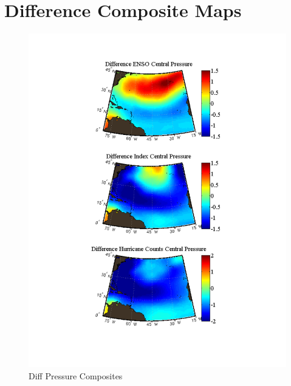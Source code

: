 \documentclass[a4paper,10pt]{article}
\begin{document}
\section{Difference Composite Maps}
\begin{figure}[ht]
\begin{minipage}[b]{0.6\linewidth}
\includegraphics[width=\textwidth]{figs/sensitivityResults/compositeMaps/centralPressureAtlanticMap.pdf}
\caption{Diff Pressure Composites}
\label{fig:figure21}
\end{minipage}
\hspace{0cm}
\begin{minipage}[b]{0.6\linewidth}

\end{minipage}
\end{figure}
\end{document}
